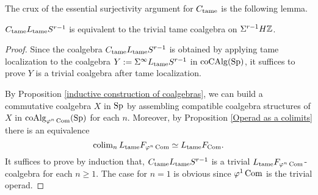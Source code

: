 The crux of the essential surjectivity argument for $C_{\operatorname{\operatorname{tame}}}$ is the following lemma.
\begin{lemma}
	\label{Sigma S^n is a trivial coalgebra}
	$C_{\operatorname{\operatorname{tame}}} L_{\operatorname{\operatorname{tame}}}S^{r-1}$ is equivalent to the trivial tame coalgebra on $\Sigma^{r-1}H{\mathbb{Z}}$.
\end{lemma}
\begin{proof}
    Since the coalgebra $C_{\operatorname{\operatorname{tame}}} L_{\operatorname{\operatorname{tame}}}S^{r-1}$ is obtained by applying tame localization to the coalgebra
	$Y:=\Sigma^{\infty}L_{\operatorname{\operatorname{tame}}}S^{r-1}$ in $\operatorname{coCAlg}(\operatorname{Sp})$, 
	it suffices to prove $Y$ is a trivial coalgebra after tame localization.
	
	By Proposition \ref{inductive construction of coalgebras}, we can build a commutative coalgebra $X$ in $\operatorname{Sp}$ by assembling compatible coalgebra structures of $X$ in $\operatorname{coAlg}_{\varphi^n \operatorname{Com}}(\operatorname{Sp})$ for each $n$. Moreover, by Proposition \ref{Operad as a colimits} there is an equivalence 
	$$
	\operatorname{colim}_{n} L_{\operatorname{\operatorname{tame}}} F_{\varphi^{n}\operatorname{Com}} \simeq L_{\operatorname{\operatorname{tame}}}F_{\operatorname{Com}}.
	$$ 
	It suffices to prove by induction that, $C_{\operatorname{\operatorname{tame}}}L_{\operatorname{\operatorname{tame}}}S^{r-1}$ is a trivial $L_{\operatorname{\operatorname{tame}}}  F_{\varphi^n\operatorname{Com}}$-coalgebra for each $n\geq 1$. 
	The case for $n=1$ is obvious since $\varphi^1\operatorname{Com}$ is the trivial operad.
	

\end{proof}
